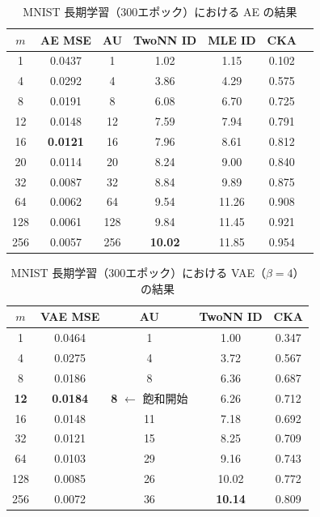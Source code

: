 \documentclass[12pt,a4paper]{ltjsarticle}  %
\begin{document}
\begin{table}[H]
  \centering
  \caption{MNIST 長期学習（300エポック）における AE の結果}
  \label{tab:e4ext_ae}
  \renewcommand{\arraystretch}{1.2}
  \begin{tabular}{ccccccc}
    \toprule
    $m$ & AE MSE & AU & TwoNN ID & MLE ID & CKA \\
    \midrule
    1   & 0.0437 & 1   & 1.02  & 1.15  & 0.102 \\
    4   & 0.0292 & 4   & 3.86  & 4.29  & 0.575 \\
    8   & 0.0191 & 8   & 6.08  & 6.70  & 0.725 \\
    12  & 0.0148 & 12  & 7.59  & 7.94  & 0.791 \\
    16  & \textbf{0.0121} & 16  & 7.96  & 8.61  & 0.812 \\
    20  & 0.0114 & 20  & 8.24  & 9.00  & 0.840 \\
    32  & 0.0087 & 32  & 8.84  & 9.89  & 0.875 \\
    64  & 0.0062 & 64  & 9.54  & 11.26 & 0.908 \\
    128 & 0.0061 & 128 & 9.84  & 11.45 & 0.921 \\
    256 & 0.0057 & 256 & \textbf{10.02} & 11.85 & 0.954 \\
    \bottomrule
  \end{tabular}
\end{table}

\begin{table}[H]
  \centering
  \caption{MNIST 長期学習（300エポック）における VAE（$\beta=4$）の結果}
  \label{tab:e4ext_vae}
  \renewcommand{\arraystretch}{1.2}
  \begin{tabular}{ccccc}
    \toprule
    $m$ & VAE MSE & AU & TwoNN ID & CKA \\
    \midrule
    1   & 0.0464 & 1  & 1.00  & 0.347 \\
    4   & 0.0275 & 4  & 3.72  & 0.567 \\
    8   & 0.0186 & 8  & 6.36  & 0.687 \\
    \textbf{12}  & \textbf{0.0184} & \textbf{8} $\leftarrow$ 飽和開始 & 6.26 & 0.712 \\
    16  & 0.0148 & 11 & 7.18  & 0.692 \\
    32  & 0.0121 & 15 & 8.25  & 0.709 \\
    64  & 0.0103 & 29 & 9.16  & 0.743 \\
    128 & 0.0085 & 26 & 10.02 & 0.772 \\
    256 & 0.0072 & 36 & \textbf{10.14} & 0.809 \\
    \bottomrule
  \end{tabular}
\end{table}
\end{document}
